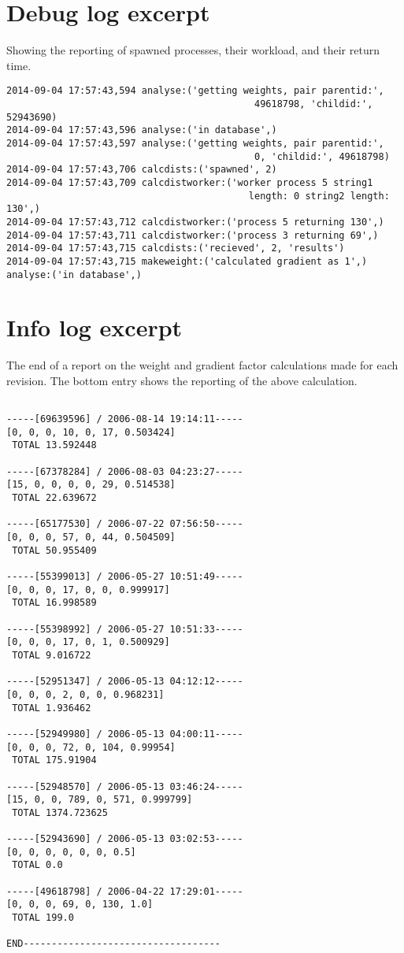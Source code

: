 \section{Debug log excerpt}
Showing the reporting of spawned processes, their workload, and their
return time.

\begin{verbatim}
2014-09-04 17:57:43,594 analyse:('getting weights, pair parentid:',
                                            49618798, 'childid:', 52943690)
2014-09-04 17:57:43,596 analyse:('in database',)
2014-09-04 17:57:43,597 analyse:('getting weights, pair parentid:', 
                                            0, 'childid:', 49618798)
2014-09-04 17:57:43,706 calcdists:('spawned', 2)
2014-09-04 17:57:43,709 calcdistworker:('worker process 5 string1 
                                           length: 0 string2 length: 130',)
2014-09-04 17:57:43,712 calcdistworker:('process 5 returning 130',)
2014-09-04 17:57:43,711 calcdistworker:('process 3 returning 69',)
2014-09-04 17:57:43,715 calcdists:('recieved', 2, 'results')
2014-09-04 17:57:43,715 makeweight:('calculated gradient as 1',)
analyse:('in database',)
\end{verbatim}

\section{Info log excerpt}
The end of a report on the weight and gradient factor calculations
made for each revision. The bottom entry shows the reporting of the
above calculation.

\begin{verbatim}

-----[69639596] / 2006-08-14 19:14:11-----
[0, 0, 0, 10, 0, 17, 0.503424]
 TOTAL 13.592448
 
-----[67378284] / 2006-08-03 04:23:27-----
[15, 0, 0, 0, 0, 29, 0.514538]
 TOTAL 22.639672
 
-----[65177530] / 2006-07-22 07:56:50-----
[0, 0, 0, 57, 0, 44, 0.504509]
 TOTAL 50.955409
 
-----[55399013] / 2006-05-27 10:51:49-----
[0, 0, 0, 17, 0, 0, 0.999917]
 TOTAL 16.998589
 
-----[55398992] / 2006-05-27 10:51:33-----
[0, 0, 0, 17, 0, 1, 0.500929]
 TOTAL 9.016722
 
-----[52951347] / 2006-05-13 04:12:12-----
[0, 0, 0, 2, 0, 0, 0.968231]
 TOTAL 1.936462
 
-----[52949980] / 2006-05-13 04:00:11-----
[0, 0, 0, 72, 0, 104, 0.99954]
 TOTAL 175.91904
 
-----[52948570] / 2006-05-13 03:46:24-----
[15, 0, 0, 789, 0, 571, 0.999799]
 TOTAL 1374.723625
 
-----[52943690] / 2006-05-13 03:02:53-----
[0, 0, 0, 0, 0, 0, 0.5]
 TOTAL 0.0
 
-----[49618798] / 2006-04-22 17:29:01-----
[0, 0, 0, 69, 0, 130, 1.0]
 TOTAL 199.0
 
END-----------------------------------
\end{verbatim}
